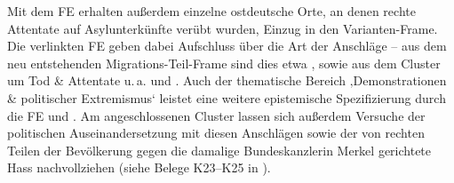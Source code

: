 Mit dem FE  erhalten außerdem einzelne ostdeutsche Orte, an denen rechte Attentate auf Asylunterkünfte verübt wurden, Einzug in den Varianten-Frame. Die verlinkten FE geben dabei Aufschluss über die Art der Anschläge -- aus dem neu entstehenden Migrations-Teil-Frame sind dies etwa ,  sowie aus dem Cluster um Tod \& Attentate u.\,a.  und . Auch der thematische Bereich ‚Demonstrationen \& politischer Extremismus` leistet eine weitere epistemische Spezifizierung durch die FE  und . Am angeschlossenen Cluster  lassen sich außerdem Versuche der politischen Auseinandersetzung mit diesen Anschlägen sowie der von rechten Teilen der Bevölkerung gegen die damalige Bundeskanzlerin Merkel gerichtete Hass nachvollziehen (siehe Belege K23--K25 in ).

